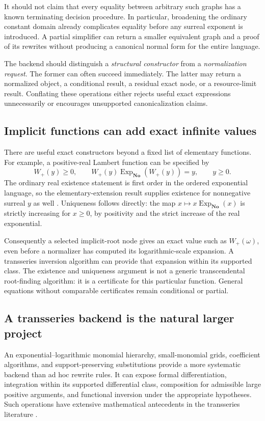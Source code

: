\documentclass[11pt,letterpaper]{article}
\theoremstyle{definition}
\newcommand{\No}{\mathbf{No}}
\newcommand{\ExpNo}{\operatorname{Exp}_{\No}}
\numberwithin{equation}{section}
\begin{document}
It should not claim that every equality between arbitrary such graphs has a known terminating decision procedure. In particular, broadening the ordinary constant domain already complicates equality before any surreal exponent is introduced. A partial simplifier can return a smaller equivalent graph and a proof of its rewrites without producing a canonical normal form for the entire language.

The backend should distinguish a \emph{structural constructor} from a \emph{normalization request}. The former can often succeed immediately. The latter may return a normalized object, a conditional result, a residual exact node, or a resource-limit result. Conflating these operations either rejects useful exact expressions unnecessarily or encourages unsupported canonicalization claims.

\subsection{Implicit functions can add exact infinite values}
There are useful exact constructors beyond a fixed list of elementary functions. For example, a positive-real Lambert function can be specified by
\[
 W_+(y)\ge0,\qquad W_+(y)\ExpNo(W_+(y))=y,\qquad y\ge0.
\]
The ordinary real existence statement is first order in the ordered exponential language, so the elementary-extension result supplies existence for nonnegative surreal $y$ as well \cite{vdDE}. Uniqueness follows directly: the map $x\mapsto x\ExpNo(x)$ is strictly increasing for $x\ge0$, by positivity and the strict increase of the real exponential.

Consequently a selected implicit-root node gives an exact value such as $W_+(\omega)$, even before a normalizer has computed its logarithmic-scale expansion. A transseries inversion algorithm can provide that expansion within its supported class. The existence and uniqueness argument is not a generic transcendental root-finding algorithm: it is a certificate for this particular function. General equations without comparable certificates remain conditional or partial.

\subsection{A transseries backend is the natural larger project}
An exponential--logarithmic monomial hierarchy, small-monomial grids, coefficient algorithms, and support-preserving substitutions provide a more systematic backend than ad hoc rewrite rules. It can expose formal differentiation, integration within its supported differential class, composition for admissible large positive arguments, and functional inversion under the appropriate hypotheses. Such operations have extensive mathematical antecedents in the transseries literature \cite{vdH}.
\end{document}
